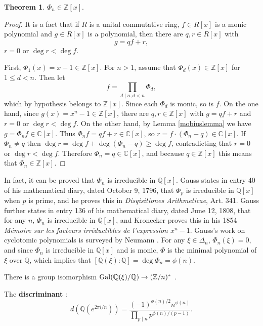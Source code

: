 \documentclass{article}
\newcommand{\Gal}{\ensuremath\mathrm{Gal}}
\theoremstyle{definition}
\newtheorem{theorem}{Theorem}
\theoremstyle{definition}
\begin{document}
\begin{theorem}
$\Phi_n \in \mathbb{Z}[x]$.
\label{Zx}
\end{theorem}
\begin{proof}
It is a fact that if $R$ is a unital commutative ring, $f \in R[x]$ is a monic polynomial and
$g \in R[x]$ is a polynomial, then there are $q,r \in R[x]$ with
\[
g = qf+r,
\]
$r=0$ or $\deg r < \deg f$.

First, $\Phi_1(x)=x-1 \in \mathbb{Z}[x]$. For $n>1$, assume that
$\Phi_d(x) \in \mathbb{Z}[x]$ for $1 \leq d < n$. Then let
\[
f = \prod_{d \mid n, d<n} \Phi_d,
\]
which by hypothesis belongs to $\mathbb{Z}[x]$. Since each $\Phi_d$ is monic, so is $f$. 
On the one hand,
since $g(x)=x^n-1 \in \mathbb{Z}[x]$, there are $q,r \in \mathbb{Z}[x]$ with
$g = q f + r$ and
$r=0$ or $\deg r < \deg f$.
On the other hand, by Lemma \ref{mobiuslemma} we have
$g = \Phi_n f \in \mathbb{C}[x]$. 
Thus $\Phi_n f = qf+r \in \mathbb{C}[x]$, 
so $r = f \cdot (\Phi_n - q) \in \mathbb{C}[x]$. If $\Phi_n \neq q$ then $\deg r = \deg f + \deg (\Phi_n-q) \geq \deg f$, contradicting that
$r=0$ or $\deg r < \deg f$. Therefore $\Phi_n = q \in \mathbb{C}[x]$, and because $q \in \mathbb{Z}[x]$ this means that
$\Phi_n \in \mathbb{Z}[x]$. 
\end{proof}

In fact, it can be proved that
$\Phi_n$ is irreducible in $\mathbb{Q}[x]$. Gauss states in entry 40 of his mathematical diary, dated
October 9, 1796, that 
$\Phi_p$ is irreducible in $\mathbb{Q}[x]$ when $p$ is prime, and he proves this
in {\em Disqisitiones Arithmeticae}, Art. 341.
Gauss further states in entry 136 of his mathematical diary, dated June 12, 1808, that for any $n$,
$\Phi_n$ is irreducible in $\mathbb{Q}[x]$, and Kronecker proves this in his
1854 {\em M\'emoire sur les facteurs irr\'eductibles de l'expression $x^n-1$}.
Gauss's work on cyclotomic polynomials is surveyed by Neumann \cite{neumannDA}.
For any $\xi \in \Delta_n$, $\Phi_n(\xi)=0$, and since $\Phi_n$ is irreducible in $\mathbb{Q}[x]$ and is monic, $\Phi$ is the minimal
polynomial of $\xi$ over $\mathbb{Q}$, which implies that $[\mathbb{Q}(\xi):\mathbb{Q}]=\deg \Phi_n=\phi(n)$.

There is a group isomorphism $\Gal(\mathbb{Q}(\xi)/\mathbb{Q}) \to (\mathbb{Z}/n)^*$ \cite[p.~596, Theorem 26]{dummit}.

The \textbf{discriminant} \cite[p.~12, Proposition 2.7]{washington}:
\[
d(\mathbb{Q}(e^{2\pi i/n})) = \frac{(-1)^{\phi(n)/2} n^{\phi(n)}}{\prod_{p \mid n} p^{\phi(n)/(p-1)}}. 
\]
\end{document}
